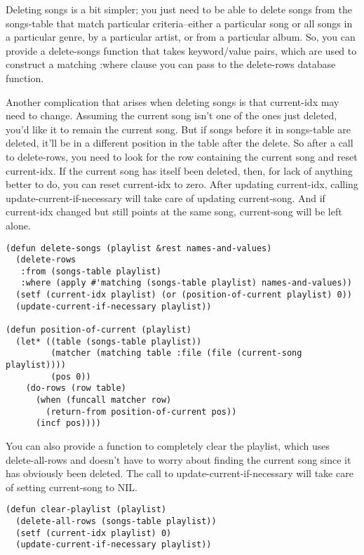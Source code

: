 Deleting songs is a bit simpler; you just need to be able to delete songs from the
songs-table that match particular criteria--either a particular song or all songs in a
particular genre, by a particular artist, or from a particular album. So, you can provide
a delete-songs function that takes keyword/value pairs, which are used to construct a
matching :where clause you can pass to the delete-rows database function.

Another complication that arises when deleting songs is that current-idx may need to
change. Assuming the current song isn't one of the ones just deleted, you'd like it to
remain the current song. But if songs before it in songs-table are deleted, it'll be in a
different position in the table after the delete. So after a call to delete-rows, you need
to look for the row containing the current song and reset current-idx. If the current song
has itself been deleted, then, for lack of anything better to do, you can reset
current-idx to zero. After updating current-idx, calling update-current-if-necessary will
take care of updating current-song. And if current-idx changed but still points at the
same song, current-song will be left alone.

\begin{lstlisting}
(defun delete-songs (playlist &rest names-and-values)
  (delete-rows
   :from (songs-table playlist)
   :where (apply #'matching (songs-table playlist) names-and-values))
  (setf (current-idx playlist) (or (position-of-current playlist) 0))
  (update-current-if-necessary playlist))

(defun position-of-current (playlist)
  (let* ((table (songs-table playlist))
         (matcher (matching table :file (file (current-song playlist))))
         (pos 0))
    (do-rows (row table)
      (when (funcall matcher row)
        (return-from position-of-current pos))
      (incf pos))))
\end{lstlisting}

You can also provide a function to completely clear the playlist, which uses
delete-all-rows and doesn't have to worry about finding the current song since it has
obviously been deleted. The call to update-current-if-necessary will take care of setting
current-song to NIL.

\begin{lstlisting}
(defun clear-playlist (playlist)
  (delete-all-rows (songs-table playlist))
  (setf (current-idx playlist) 0)
  (update-current-if-necessary playlist))
\end{lstlisting}

